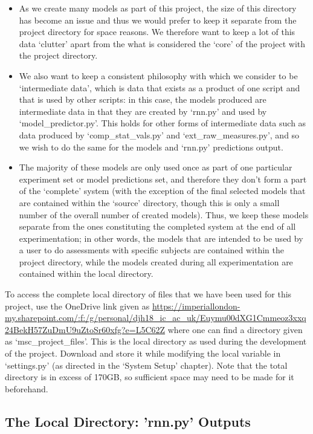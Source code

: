 \documentclass[12pt,twoside]{report}
\begin{document}
\begin{itemize}
	\item As we create many models as part of this project, the size of this directory has become an issue and thus we would prefer to keep it separate from the project directory for space reasons. We therefore want to keep a lot of this data ‘clutter’ apart from the what is considered the ‘core’ of the project with the project directory.
	\item We also want to keep a consistent philosophy with which we consider to be ‘intermediate data’, which is data that exists as a product of one script and that is used by other scripts: in this case, the models produced are intermediate data in that they are created by ‘rnn.py’ and used by ‘model\_predictor.py’. This holds for other forms of intermediate data such as data produced by ‘comp\_stat\_vals.py’ and ‘ext\_raw\_measures.py’, and so we wish to do the same for the models and ‘rnn.py’ predictions output.
	\item The majority of these models are only used once as part of one particular experiment set or model predictions set, and therefore they don’t form a part of the ‘complete’ system (with the exception of the final selected models that are contained within the ‘source’ directory, though this is only a small number of the overall number of created models). Thus, we keep these models separate from the ones constituting the completed system at the end of all experimentation; in other words, the models that are intended to be used by a user to do assessments with specific subjects are contained within the project directory, while the models created during all experimentation are contained within the local directory.
\end{itemize}

\quad To access the complete local directory of files that we have been used for this project, use the OneDrive link given as \url{https://imperiallondon-my.sharepoint.com/:f:/g/personal/djh18\_ic\_ac\_uk/Euymu00dXG1Cmmeoz3xxq24BekH57ZuDmU9uZtoSr60xfg?e=L5C62Z} where one can find a directory given as ‘msc\_project\_files’. This is the local directory as used during the development of the project. Download and store it while modifying the local variable in ‘settings.py’ (as directed in the ‘System Setup’ chapter). Note that the total directory is in excess of 170GB, so sufficient space may need to be made for it beforehand.


\subsection{The Local Directory: 'rnn.py' Outputs}
\end{document}
